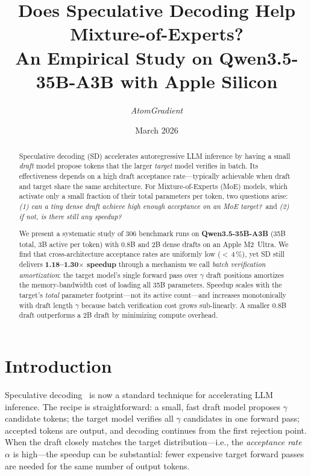 \documentclass[11pt,a4paper]{article}
\title{%
  \textbf{Does Speculative Decoding Help Mixture-of-Experts?}\\[0.3em]
  \large An Empirical Study on Qwen3.5-35B-A3B with Apple Silicon
}
\author{\textit{AtomGradient}}
\date{March 2026}
\begin{document}
\maketitle

\begin{abstract}
Speculative decoding (SD) accelerates autoregressive LLM inference by having a small \emph{draft} model propose tokens that the larger \emph{target} model verifies in batch. Its effectiveness depends on a high draft acceptance rate---typically achievable when draft and target share the same architecture. For Mixture-of-Experts (MoE) models, which activate only a small fraction of their total parameters per token, two questions arise: \emph{(1) can a tiny dense draft achieve high enough acceptance on an MoE target?}\ and \emph{(2) if not, is there still any speedup?}

We present a systematic study of 306 benchmark runs on \textbf{Qwen3.5-35B-A3B} (35B total, 3B active per token) with 0.8B and 2B dense drafts on an Apple M2~Ultra. We find that cross-architecture acceptance rates are uniformly low ($<$\,4\,\%), yet SD still delivers \textbf{1.18--1.30$\times$ speedup} through a mechanism we call \emph{batch verification amortization}: the target model's single forward pass over $\gamma$ draft positions amortizes the memory-bandwidth cost of loading all 35B parameters. Speedup scales with the target's \emph{total} parameter footprint---not its active count---and increases monotonically with draft length $\gamma$ because batch verification cost grows sub-linearly. A smaller 0.8B draft outperforms a 2B draft by minimizing compute overhead.
\end{abstract}

\section{Introduction}

Speculative decoding~\cite{leviathan2023fast, chen2023accelerating} is now a standard technique for accelerating LLM inference. The recipe is straightforward: a small, fast draft model proposes $\gamma$ candidate tokens; the target model verifies all $\gamma$ candidates in one forward pass; accepted tokens are output, and decoding continues from the first rejection point. When the draft closely matches the target distribution---i.e., the \emph{acceptance rate} $\alpha$ is high---the speedup can be substantial: fewer expensive target forward passes are needed for the same number of output tokens.
\end{document}
